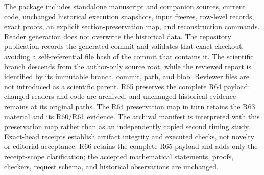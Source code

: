 \documentclass[11pt,letterpaper]{article}
\theoremstyle{definition}\newtheorem{remark}[theorem]{Remark}
\begin{document}
The package includes standalone manuscript and companion sources, current code, unchanged historical execution snapshots, input freezes, row-level records, exact proofs, an explicit section-preservation map, and reconstruction commands. Reader generation does not overwrite the historical data. The repository publication records the generated commit and validates that exact checkout, avoiding a self-referential file hash of the commit that contains it. The scientific branch descends from the author-only source root, while the reviewed report is identified by its immutable branch, commit, path, and blob. Reviewer files are not introduced as a scientific parent. R65 preserves the complete R64 payload: changed readers and code are archived, and unchanged historical evidence remains at its original paths. The R64 preservation map in turn retains the R63 material and its R60/R61 evidence. The archival manifest is interpreted with this preservation map rather than as an independently copied second timing study. Exact-head receipts establish artifact integrity and executed checks, not novelty or editorial acceptance. R66 retains the complete R65 payload and adds only the receipt-scope clarification; the accepted mathematical statements, proofs, checkers, request schema, and historical observations are unchanged.
\clearpage{}\label{ec-refs-start}
\end{document}
